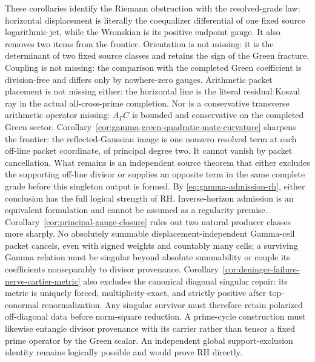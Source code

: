 \documentclass[11pt]{article}
\theoremstyle{definition}
\theoremstyle{remark}
\begin{document}
These corollaries identify the Riemann obstruction with the resolved-grade law:
horizontal displacement is literally the coequalizer differential of one
fixed source logarithmic jet, while the Wronskian is its positive endpoint
gauge.  It also removes two items from the frontier.  Orientation is not
missing: it is the determinant of two fixed source classes and retains the
sign of the Green fracture.  Coupling is not missing: the comparison with
the completed Green coefficient is division-free and differs only by
nowhere-zero gauges.  Arithmetic packet placement is not missing either:
the horizontal line is the literal residual Koszul ray in the actual
all-cross-prime completion.  Nor is a conservative transverse arithmetic
operator missing: \(A_\Gamma C\) is bounded and conservative on the completed
Green sector.  Corollary~\ref{cor:gamma-green-quadratic-mate-curvature}
sharpens the frontier: the reflected-Gaussian image is one nonzero resolved
term at each off-line packet coordinate, of principal degree two.  It cannot
vanish by packet cancellation.  What remains is an independent source
theorem that either excludes the supporting off-line divisor or supplies an
opposite term in the same complete grade before this singleton output is
formed.  By \eqref{eq:gamma-admission-rh}, either conclusion has the full
logical strength of RH.  Inverse-horizon admission is an equivalent
formulation and cannot be assumed as a regularity premise.
Corollary~\ref{cor:principal-gauge-closure} rules out two natural producer
classes more sharply.  No absolutely summable
displacement-independent Gamma-cell packet cancels, even with signed
weights and countably many cells; a surviving Gamma relation must be
singular beyond absolute summability or couple its coefficients nonseparably
to divisor provenance.  Corollary~\ref{cor:deninger-failure-nerve-cartier-metric}
also excludes the canonical diagonal singular repair: its metric is uniquely
forced, multiplicity-exact, and strictly positive after top-conormal
renormalization.  Any singular survivor must therefore retain polarized
off-diagonal data before norm-square reduction.  A
prime-cycle construction must likewise entangle divisor provenance with its
carrier rather than tensor a fixed prime operator by the Green scalar.  An
independent global support-exclusion identity remains logically possible and
would prove RH directly.
\end{document}
